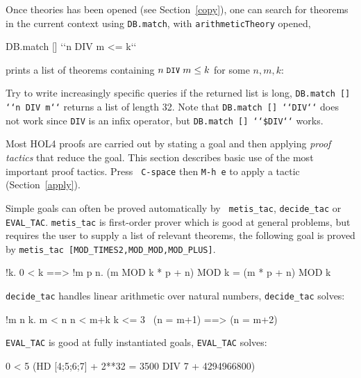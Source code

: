 \documentclass[a4paper,10pt]{article}
\begin{document}
Once theories has been opened (see Section~\ref{copy}), one can search for theorems in the current
context using {\tt DB.match}, \eg{} with {\tt arithmeticTheory} opened,
\begin{code}
DB.match [] {`}`n DIV m <= k{`}`
\end{code}
prints a list of theorems containing $n\; \texttt{\small DIV} \;m \leq k$ for some $n,m,k$:
\begin{code}
[(("arithmetic", "DIV_LE_MONOTONE"),
  (|- !n x y. 0 < n \conj{} x <= y ==> x DIV n <= y DIV n, Thm)),
 (("arithmetic", "DIV_LE_X"),
  (|- !x y z. 0 < z ==> (y DIV z <= x = y < (x + 1) * z), Thm)),
 (("arithmetic", "DIV_LESS_EQ"),
  (|- !n. 0 < n ==> !k. k DIV n <= k, Thm))]
\end{code}
Try to write increasingly specific queries if the returned list is long, \eg{}
{\tt\small DB.match [] {`}`n DIV m{`}`} returns a list of length 32. Note that {\tt\small DB.match [] {`}`DIV{`}`}
does not work since {\tt\small DIV} is an infix operator, but {\tt\small DB.match [] {`}`\$DIV{`}`} works.


Most HOL4 proofs are carried out by stating a goal and then applying
\emph{proof tactics} that reduce the goal.  This section describes
basic use of the most important proof tactics.  Press {\tt\small
  C-space} then {\tt\small M-h e} to apply a tactic
(Section~\ref{apply}).



Simple goals can often be proved automatically by {\tt\small
  metis\_tac}, {\tt\small decide\_tac} or {\tt\small EVAL\_TAC}.
{\tt\small metis\_tac} is first-order prover which is good at general
problems, but requires the user to supply a list of relevant theorems,
\eg{} the following goal is proved by {\tt\small metis\_tac
  [MOD\_TIMES2,MOD\_MOD,MOD\_PLUS]}.
\begin{code}
!k. 0 < k ==> !m p n. (m MOD k * p + n) MOD k = (m * p + n) MOD k
\end{code}

\noindent
{\tt\small decide\_tac} handles linear arithmetic over natural
numbers, \eg{} {\tt\small decide\_tac} solves:
\begin{code}
!m n k. m < n \conj{} n < m+k \conj{} k <= 3 \conj{} ~(n = m+1) ==> (n = m+2)
\end{code}
{\tt\small EVAL\_TAC} is good at fully instantiated goals, \eg{} {\tt\small EVAL\_TAC} solves:
\begin{code}
0 < 5 \conj{} (HD [4;5;6;7] + 2**32 = 3500 DIV 7 + 4294966800)
\end{code}
\end{document}
